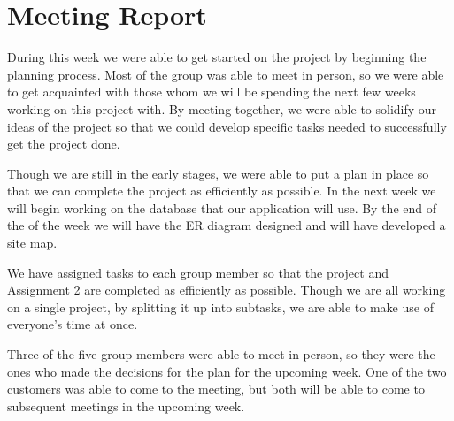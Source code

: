 \documentclass[12pt]{article}
\begin{document}
\section{Meeting Report}
\begin{flushleft}
During this week we were able to get started on the project by beginning the planning process. Most of the group was able to meet in person, so we were able to get acquainted with those whom we will be spending the next few weeks working on this project with. By meeting together, we were able to solidify our ideas of the project so that we could develop specific tasks needed to successfully get the project done.
\end{flushleft}
\begin{flushleft}
Though we are still in the early stages, we were able to put a plan in place so that we can complete the project as efficiently as possible. In the next week we will begin working on the database that our application will use. By the end of the of the week we will have the ER diagram designed and will have developed a site map.
\end{flushleft}
We have assigned tasks to each group member so that the project and Assignment 2 are completed as efficiently as possible. Though we are all working on a single project, by splitting it up into subtasks, we are able to make use of everyone’s time at once.
\begin{flushleft}
Three of the five group members were able to meet in person, so they were the ones who made the decisions for the plan for the upcoming week. One of the two customers was able to come to the meeting, but both will be able to come to subsequent meetings in the upcoming week.
\end{flushleft}
\end{document}
